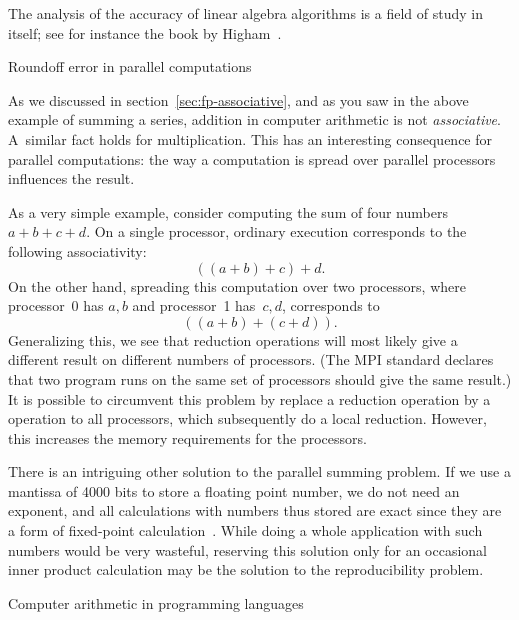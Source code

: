 The analysis of the accuracy of linear algebra algorithms is a field
of study in itself; see for instance the book by
Higham~\cite{Higham:2002:ASN}.

 {Roundoff error in parallel computations}
\label{sec:roundoff-parallel}

As we discussed in section~\ref{sec:fp-associative}, and as you saw
in the above example of summing a series, addition in
computer arithmetic is not
\emph{associative}.
A~similar fact holds for
multiplication.  This has an interesting consequence for parallel
computations: the way a computation is spread over parallel processors
influences the result. 

As a very simple example, consider computing the sum of four numbers $a+b+c+d$.
On a single processor, ordinary execution corresponds to the following associativity:
\begin{equation}
  ((a+b)+c)+d.
\end{equation}
On the other hand, spreading this computation over two processors, 
where processor~0 has $a,b$ and processor~1 has~$c,d$,
corresponds to
\begin{equation}
  ((a+b)+(c+d)).
\end{equation}
Generalizing this, we see that reduction operations will most likely
give a different result on different numbers of processors. (The MPI
standard declares that two program runs on the same set of processors
should give the same result.)
It is possible to circumvent this problem by replace a reduction operation
by a  operation to all processors, which subsequently 
do a local reduction. However, this increases the memory requirements for the 
processors.

There is an intriguing other solution to the parallel summing problem.
If we use a mantissa of 4000 bits to store a floating point number, we
do not need an exponent, and all calculations with numbers thus stored
are exact since they are a form of fixed-point
calculation~\cite{Kulisch:2011:VFE,Kulish:dotproduct}.  While doing a
whole application with such numbers would be very wasteful, reserving
this solution only for an occasional inner product calculation may be
the solution to the reproducibility problem.


 {Computer arithmetic in programming languages}

